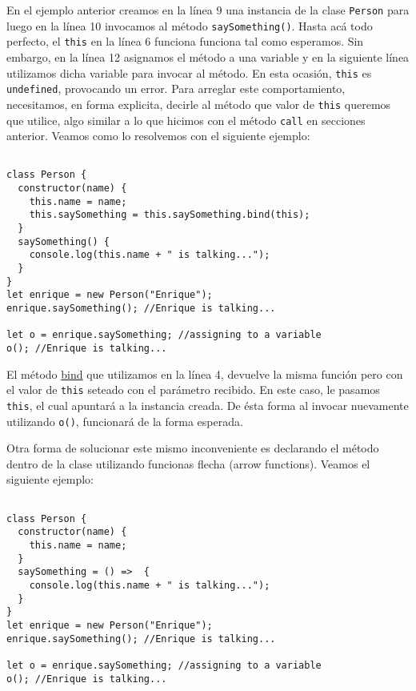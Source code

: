 \documentclass[a4paper, oneside, titlepage, 12pt]{book}
\begin{document}
En el ejemplo anterior creamos en la línea 9 una instancia de la clase \texttt{Person} para luego en la línea 10 invocamos al método \texttt{saySomething()}. Hasta acá todo perfecto, el \texttt{this} en la línea 6 funciona funciona tal como esperamos. Sin embargo, en la línea 12 asignamos el método a una variable y en la siguiente línea utilizamos dicha variable para invocar al método. En esta ocasión, \texttt{this} es \texttt{undefined}, provocando un error. Para arreglar este comportamiento, necesitamos, en forma explicita, decirle al método que valor de \texttt{this} queremos que utilice, algo similar a lo que hicimos con el método \texttt{call} en secciones anterior. Veamos como lo resolvemos con el siguiente ejemplo:
 
\begin{verbatim}

class Person {
  constructor(name) {
    this.name = name;
    this.saySomething = this.saySomething.bind(this);    
  }
  saySomething() {
    console.log(this.name + " is talking...");
  }
}
let enrique = new Person("Enrique");
enrique.saySomething(); //Enrique is talking...

let o = enrique.saySomething; //assigning to a variable
o(); //Enrique is talking...
\end{verbatim}

El método \href{https://developer.mozilla.org/es/docs/Web/JavaScript/Reference/Global_Objects/Function/bind}{bind} que utilizamos en la línea 4, devuelve la misma función pero con el valor de \texttt{this} seteado con el parámetro recibido. En este caso, le pasamos \texttt{this}, el cual apuntará a la instancia creada. De ésta forma al invocar nuevamente utilizando \texttt{o()}, funcionará de la forma esperada.
\newline

Otra forma de solucionar este mismo inconveniente es declarando el método dentro de la clase utilizando funcionas flecha (arrow functions). Veamos el siguiente ejemplo:

\begin{verbatim}

class Person {
  constructor(name) {
    this.name = name;
  }
  saySomething = () =>  {
    console.log(this.name + " is talking...");
  }
}
let enrique = new Person("Enrique");
enrique.saySomething(); //Enrique is talking...

let o = enrique.saySomething; //assigning to a variable
o(); //Enrique is talking...
\end{verbatim}
\end{document}
